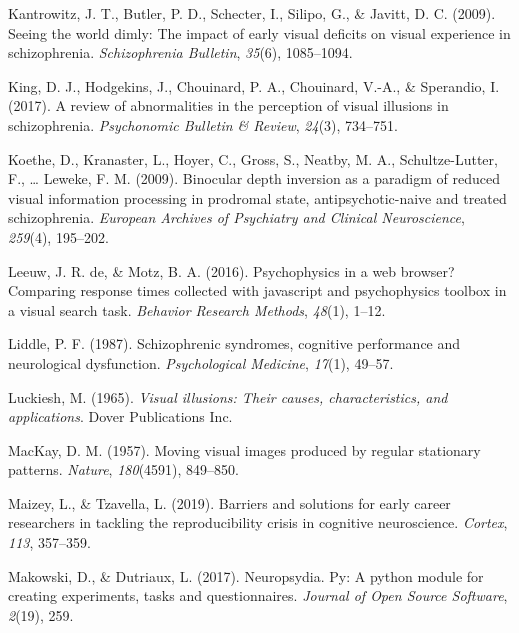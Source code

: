 \documentclass[
  english,
  man,floatsintext]{apa6}
\newlength{\cslhangindent}
\newenvironment{cslreferences}%
  {\setlength{\parindent}{0pt}%
  \everypar{\setlength{\hangindent}{\cslhangindent}}\ignorespaces}%
  {\par}
\begin{document}
\begin{cslreferences}
\leavevmode\hypertarget{ref-kantrowitz2009seeing}{}%
Kantrowitz, J. T., Butler, P. D., Schecter, I., Silipo, G., \& Javitt, D. C. (2009). Seeing the world dimly: The impact of early visual deficits on visual experience in schizophrenia. \emph{Schizophrenia Bulletin}, \emph{35}(6), 1085--1094.

\leavevmode\hypertarget{ref-king2017review}{}%
King, D. J., Hodgekins, J., Chouinard, P. A., Chouinard, V.-A., \& Sperandio, I. (2017). A review of abnormalities in the perception of visual illusions in schizophrenia. \emph{Psychonomic Bulletin \& Review}, \emph{24}(3), 734--751.

\leavevmode\hypertarget{ref-koethe2009binocular}{}%
Koethe, D., Kranaster, L., Hoyer, C., Gross, S., Neatby, M. A., Schultze-Lutter, F., \ldots{} Leweke, F. M. (2009). Binocular depth inversion as a paradigm of reduced visual information processing in prodromal state, antipsychotic-naive and treated schizophrenia. \emph{European Archives of Psychiatry and Clinical Neuroscience}, \emph{259}(4), 195--202.

\leavevmode\hypertarget{ref-de2016psychophysics}{}%
Leeuw, J. R. de, \& Motz, B. A. (2016). Psychophysics in a web browser? Comparing response times collected with javascript and psychophysics toolbox in a visual search task. \emph{Behavior Research Methods}, \emph{48}(1), 1--12.

\leavevmode\hypertarget{ref-liddle1987schizophrenic}{}%
Liddle, P. F. (1987). Schizophrenic syndromes, cognitive performance and neurological dysfunction. \emph{Psychological Medicine}, \emph{17}(1), 49--57.

\leavevmode\hypertarget{ref-LuckieshVisualIllusions1965}{}%
Luckiesh, M. (1965). \emph{Visual illusions: Their causes, characteristics, and applications}. Dover Publications Inc.

\leavevmode\hypertarget{ref-mackay1957moving}{}%
MacKay, D. M. (1957). Moving visual images produced by regular stationary patterns. \emph{Nature}, \emph{180}(4591), 849--850.

\leavevmode\hypertarget{ref-maizey2019barriers}{}%
Maizey, L., \& Tzavella, L. (2019). Barriers and solutions for early career researchers in tackling the reproducibility crisis in cognitive neuroscience. \emph{Cortex}, \emph{113}, 357--359.

\leavevmode\hypertarget{ref-makowski2017neuropsydia}{}%
Makowski, D., \& Dutriaux, L. (2017). Neuropsydia. Py: A python module for creating experiments, tasks and questionnaires. \emph{Journal of Open Source Software}, \emph{2}(19), 259.


\end{cslreferences}
\end{document}
